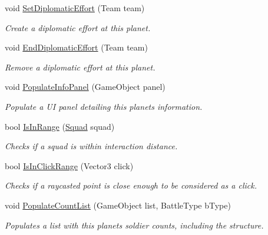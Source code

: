 \begin{DoxyCompactItemize}
void \hyperlink{class_tile_a5b363f183bff4074d9c7a6fd69a98097}{Set\+Diplomatic\+Effort} (Team team)
\begin{DoxyCompactList}\small\item\em Create a diplomatic effort at this planet. \end{DoxyCompactList}\item 
void \hyperlink{class_tile_ac013a5609e2b1a49d1c4a3b176c53e4e}{End\+Diplomatic\+Effort} (Team team)
\begin{DoxyCompactList}\small\item\em Remove a diplomatic effort at this planet. \end{DoxyCompactList}\item 
void \hyperlink{class_tile_af880b01f5b8be2145350fb16b4dc516f}{Populate\+Info\+Panel} (Game\+Object panel)
\begin{DoxyCompactList}\small\item\em Populate a U\+I panel detailing this planet\textquotesingle{}s information. \end{DoxyCompactList}\item 
bool \hyperlink{class_tile_a5aa05cf39a2e6ae60048c0870e552bec}{Is\+In\+Range} (\hyperlink{class_squad}{Squad} squad)
\begin{DoxyCompactList}\small\item\em Checks if a squad is within interaction distance. \end{DoxyCompactList}\item 
bool \hyperlink{class_tile_a6cb05494bb47e88f93a207281bca1530}{Is\+In\+Click\+Range} (Vector3 click)
\begin{DoxyCompactList}\small\item\em Checks if a raycasted point is close enough to be considered as a click. \end{DoxyCompactList}\item 
void \hyperlink{class_tile_a47560f3ae0221e1a3ddae1ff2b6befaa}{Populate\+Count\+List} (Game\+Object list, Battle\+Type b\+Type)
\begin{DoxyCompactList}\small\item\em Populates a list with this planet\textquotesingle{}s soldier counts, including the structure. \end{DoxyCompactList}\end{DoxyCompactItemize}
